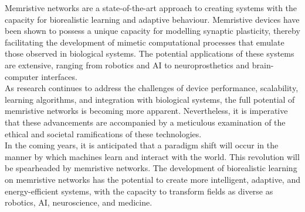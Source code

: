 \noindent Memristive networks are a state-of-the-art approach to creating systems with the capacity for biorealistic learning and adaptive behaviour. Memristive devices have been shown to possess a unique capacity for modelling synaptic plasticity, thereby facilitating the development of mimetic computational processes that emulate those observed in biological systems. The potential applications of these systems are extensive, ranging from robotics and AI to neuroprosthetics and brain-computer interfaces.\\

\noindent As research continues to address the challenges of device performance, scalability, learning algorithms, and integration with biological systems, the full potential of memristive networks is becoming more apparent. Nevertheless, it is imperative that these advancements are accompanied by a meticulous examination of the ethical and societal ramifications of these technologies.\\

\noindent In the coming years, it is anticipated that a paradigm shift will occur in the manner by which machines learn and interact with the world. This revolution will be spearheaded by memristive networks. The development of biorealistic learning on memristive networks has the potential to create more intelligent, adaptive, and energy-efficient systems, with the capacity to transform fields as diverse as robotics, AI, neuroscience, and medicine.